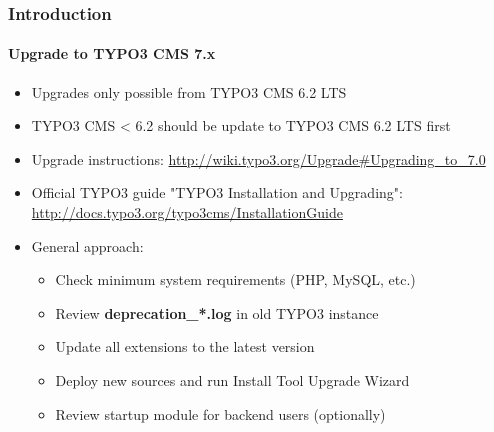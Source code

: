 \begin{frame}[fragile]
	\frametitle{Introduction}
	\framesubtitle{Upgrade to TYPO3 CMS 7.x}

	\begin{itemize}
		\item Upgrades only possible from TYPO3 CMS 6.2 LTS
		\item TYPO3 CMS < 6.2 should be update to TYPO3 CMS 6.2 LTS first
	\end{itemize}

	\begin{itemize}

		\item Upgrade instructions:\newline
			\smaller\url{http://wiki.typo3.org/Upgrade#Upgrading_to_7.0}\normalsize
		\item Official TYPO3 guide "TYPO3 Installation and Upgrading":
			\smaller\url{http://docs.typo3.org/typo3cms/InstallationGuide}\normalsize
		\item General approach:
			\begin{itemize}
				\item Check minimum system requirements \small(PHP, MySQL, etc.)
				\item Review \textbf{deprecation\_*.log} in old TYPO3 instance
				\item Update all extensions to the latest version
				\item Deploy new sources and run Install Tool \textrightarrow Upgrade Wizard
				\item Review startup module for backend users (optionally)
			\end{itemize}
	\end{itemize}

\end{frame}

